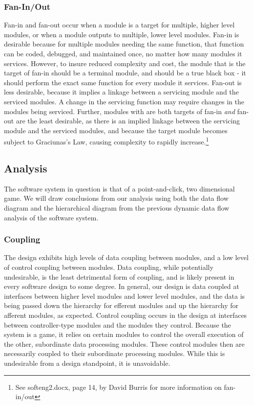\documentclass{article}
\begin{document}
		\subsubsection{Fan-In/Out}
			Fan-in and fan-out occur when a module is a target for multiple, higher level modules, or when a module outputs to multiple, lower level modules. Fan-in is desirable because for multiple modules needing the same function, that function can be coded, debugged, and maintained once, no matter how many modules it services. However, to insure reduced complexity and cost, the module that is the target of fan-in should be a terminal module, and should be a true black box - it should perform the exact same function for every module it services. Fan-out is less desirable, because it implies a linkage between a servicing module and the serviced modules. A change in the servicing function may require changes in the modules being serviced. Further, modules with are both targets of fan-in \emph{and} fan-out are the least desirable, as there is an implied linkage between the servicing module and the serviced modules, and because the target module becomes subject to Graciunas's Law, causing complexity to rapidly increase.\footnote{See softeng2.docx, page 14, by David Burris for more information on fan-in/out} 
	\subsection{Analysis}
		The software system in question is that of a point-and-click, two dimensional game. We will draw conclusions from our analysis using both the data flow diagram and the hierarchical diagram from the previous dynamic data flow analysis of the software system. 
		\subsubsection{Coupling}
			The design exhibits high levels of data coupling between modules, and a low level of control coupling between modules. Data coupling, while potentially undesirable, is the least detrimental form of coupling, and is likely present in every software design to some degree. In general, our design is data coupled at interfaces between higher level modules and lower level modules, and the data is being passed down the hierarchy for efferent modules and up the hierarchy for afferent modules, as expected. Control coupling occurs in the design at interfaces between controller-type modules and the modules they control. Because the system is a game, it relies on certain modules to control the overall execution of the other, subordinate data processing modules. These control modules then are necessarily coupled to their subordinate processing modules. While this is undesirable from a design standpoint, it is unavoidable. 
\end{document}
